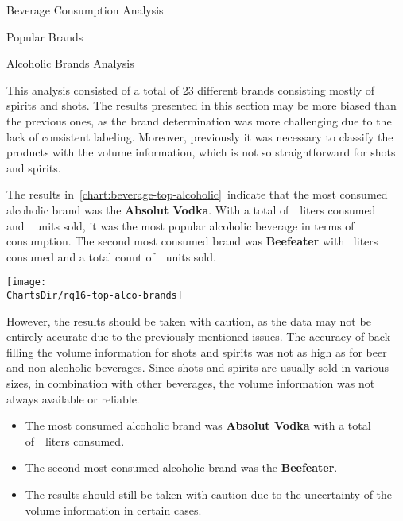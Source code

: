 \begin{section}{Beverage Consumption Analysis}
\begin{subsection}{Popular Brands}
\begin{subsubsection}{Alcoholic Brands Analysis}

			This analysis consisted of a total of 23 different brands consisting mostly of spirits and shots.
			The results presented in this section may be more biased than the previous ones, as the brand determination was more challenging due to the lack of consistent labeling.
			Moreover, previously it was necessary to classify the products with the volume information, which is not so straightforward for shots and spirits.

			The results in~\autoref{chart:beverage-top-alcoholic}~indicate that the most consumed alcoholic brand was the \textbf{Absolut Vodka}.
			With a total of~~liters consumed and~~units sold, it was the most popular alcoholic beverage in terms of consumption.
			The second most consumed brand was \textbf{Beefeater} with ~liters consumed and a total count of~~units sold.

			\begin{chart}[H]
				\centering
				\texttt{[image: \\ChartsDir/rq16-top-alco-brands]}
				\caption{ Most Consumed Non-Alcoholic Brands}
				\label{chart:beverage-top-alcoholic}
				\source
			\end{chart}

			However, the results should be taken with caution, as the data may not be entirely accurate due to the previously mentioned issues.
			The accuracy of back-filling the volume information for shots and spirits was not as high as for beer and non-alcoholic beverages.
			Since shots and spirits are usually sold in various sizes, in combination with other beverages, the volume information was not always available or reliable.

			\begin{keytakeaways}
				\begin{itemize}
					\item The most consumed alcoholic brand was \textbf{Absolut Vodka} with a total of~~liters consumed.
					\item The second most consumed alcoholic brand was the \textbf{Beefeater}.
					\item The results should still be taken with caution due to the uncertainty of the volume information in certain cases.
				\end{itemize}
			\end{keytakeaways}
		\end{subsubsection}
	\end{subsection}


\end{section}

